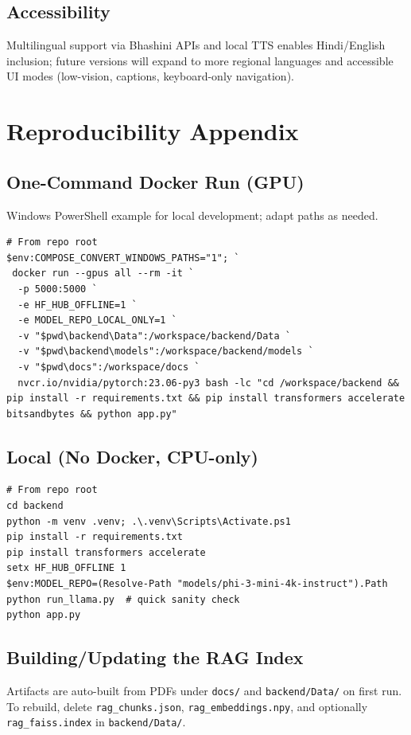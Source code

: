 \documentclass[conference]{IEEEtran}
\begin{document}
\subsection{Accessibility}
Multilingual support via Bhashini APIs and local TTS enables Hindi/English inclusion; future versions will expand to more regional languages and accessible UI modes (low-vision, captions, keyboard-only navigation).

\section{Reproducibility Appendix}
\subsection{One-Command Docker Run (GPU)}
Windows PowerShell example for local development; adapt paths as needed.
\begin{lstlisting}[basicstyle=\ttfamily\small]
# From repo root
$env:COMPOSE_CONVERT_WINDOWS_PATHS="1"; `
 docker run --gpus all --rm -it `
  -p 5000:5000 `
  -e HF_HUB_OFFLINE=1 `
  -e MODEL_REPO_LOCAL_ONLY=1 `
  -v "$pwd\backend\Data":/workspace/backend/Data `
  -v "$pwd\backend\models":/workspace/backend/models `
  -v "$pwd\docs":/workspace/docs `
  nvcr.io/nvidia/pytorch:23.06-py3 bash -lc "cd /workspace/backend && pip install -r requirements.txt && pip install transformers accelerate bitsandbytes && python app.py"
\end{lstlisting}

\subsection{Local (No Docker, CPU-only)}
\begin{lstlisting}[basicstyle=\ttfamily\small]
# From repo root
cd backend
python -m venv .venv; .\.venv\Scripts\Activate.ps1
pip install -r requirements.txt
pip install transformers accelerate
setx HF_HUB_OFFLINE 1
$env:MODEL_REPO=(Resolve-Path "models/phi-3-mini-4k-instruct").Path
python run_llama.py  # quick sanity check
python app.py
\end{lstlisting}

\subsection{Building/Updating the RAG Index}
Artifacts are auto-built from PDFs under \texttt{docs/} and \texttt{backend/Data/} on first run. To rebuild, delete \texttt{rag\_chunks.json}, \texttt{rag\_embeddings.npy}, and optionally \texttt{rag\_faiss.index} in \texttt{backend/Data/}.
\end{document}

